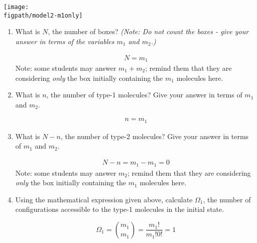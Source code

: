 \begin{activity}
\begin{ctqs}
	\vspace{6pt}
	\centerline{\texttt{[image: \\figpath/model2-m1only]}}
	\vspace{-10pt}
	
			\begin{enumerate}
				\item What is $N$, the number of boxes?	\emph{(Note: Do not count the boxes - give your answer in terms of the variables $m_1$ and $m_2$.)}
				
					\begin{solution}[0.6in]
						\vspace{-20pt}
						\begin{align*}
							N = m_1
						\end{align*}
						Note: some students may answer $m_1+m_2$; remind them that they are considering \emph{only} the box initially containing the $m_1$ molecules here.
					\end{solution}
				
				\item What is $n$, the number of type-1 molecules?  Give your answer in terms of $m_1$ and $m_2$.
				
					\begin{solution}[0.6in]
						\begin{align*}
							n = m_1
						\end{align*}
					\end{solution}
				
				\item What is $N-n$, the number of type-2 molecules? Give your answer in terms of $m_1$ and $m_2$.
				
					\begin{solution}[0.5in]
						\vspace{-20pt}
						\begin{align*}
							N-n = m_1 - m_1 = 0
						\end{align*}
						Note: some students may answer $m_2$; remind them that they are considering \emph{only} the box initially containing the $m_1$ molecules here.
					\end{solution}
					
				\item Using the mathematical expression given above, calculate $\Omega_1$, the number of configurations accessible to the type-1 molecules in the initial state.
				
					\begin{solution}[1.5in]
						\begin{equation*}
							\Omega_1 = {m_1 \choose m_1} = \frac{m_1!}{m_1! 0!} = 1
						\end{equation*}
					\end{solution}
				

\end{enumerate}
\end{ctqs}
\end{activity}
